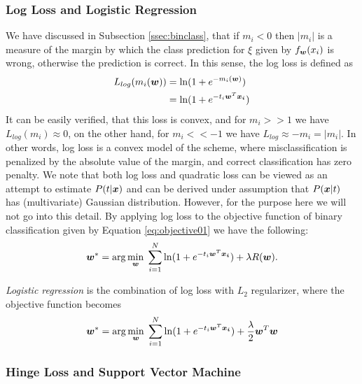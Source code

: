 \subsubsection{Log Loss and Logistic Regression}

We have discussed in Subsection \ref{ssec:binclass}, that if $m_i < 0$ then $|m_i|$ is a measure of the margin by which the class prediction for $\xi$ given by $f_{\boldsymbol{w}}(x_i)$ is wrong, otherwise the prediction is correct. In this sense, the log loss is defined as 
\[ \begin{split}
L_{log}(m_i(\boldsymbol{w})) &= \ln (1 + e^{-m_i(\boldsymbol{w})}) \\
 &= \ln (1 + e^{-t_i\boldsymbol{w}^T\boldsymbol{x_i}}) 
\end{split} \] 
It can be easily verified, that this loss is convex, and for $m_i >> 1$ we have $L_{log}(m_i) \approx 0$, on the other hand, for $m_i << -1$ we have $L_{log} \approx -m_i = |m_i|$. In other words, log loss is a convex model of the scheme, where misclassification is penalized by the absolute value of the margin, and correct classification has zero penalty. We note that both log loss and quadratic loss can be viewed as an attempt to estimate $P(t|\boldsymbol{x})$ and can be derived under assumption that $P(\boldsymbol{x}|t)$ has (multivariate) Gaussian distribution. However, for the purpose here we will not go into this detail. By applying log loss to the objective function of binary classification given by Equation \ref{eq:objective01} we have the following:
\begin{equation}
\label{eq:logobj}
\boldsymbol{w}^* = \arg\min_{\boldsymbol{w}} \; \sum_{i=1}^{N} \ln(1 + e^{-t_i\boldsymbol{w}^T\boldsymbol{x_i}})  + \lambda R(\boldsymbol{w}).
\end{equation}

\emph{Logistic regression} is the combination of log loss with $L_2$ regularizer, where the objective function becomes 
\[ \begin{split}
\boldsymbol{w}^* & = \arg\min_{\boldsymbol{w}} \; \sum_{i=1}^{N} \ln(1 + e^{-t_i\boldsymbol{w}^T\boldsymbol{x_i}}) + \frac{\lambda}{2} \boldsymbol{w}^T\boldsymbol{w} \\
\end{split} \]

\subsubsection{Hinge Loss and Support Vector Machine}

